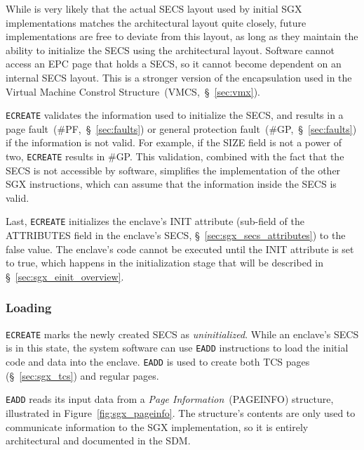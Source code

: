 While is very likely that the actual SECS layout used by initial SGX
implementations matches the architectural layout quite closely, future
implementations are free to deviate from this layout, as long as they maintain
the ability to initialize the SECS using the architectural layout.
Software cannot access an EPC page that holds a SECS, so it cannot become
dependent on an internal SECS layout. This is a stronger version of the
encapsulation used in the Virtual Machine Constrol
Structure~(VMCS,~\S~\ref{sec:vmx}).

\texttt{ECREATE} validates the information used to initialize the SECS, and
results in a page fault~(\#PF,~\S~\ref{sec:faults}) or general protection
fault~(\#GP,~\S~\ref{sec:faults}) if the information is not valid. For example,
if the SIZE field is not a power of two, \texttt{ECREATE} results in \#GP. This
validation, combined with the fact that the SECS is not accessible by software,
simplifies the implementation of the other SGX instructions, which can assume
that the information inside the SECS is valid.

Last, \texttt{ECREATE} initializes the enclave's INIT attribute (sub-field of
the ATTRIBUTES field in the enclave's SECS, \S~\ref{sec:sgx_secs_attributes})
to the false value. The enclave's code cannot be executed until the INIT
attribute is set to true, which happens in the initialization stage that will
be described in \S~\ref{sec:sgx_einit_overview}.


\subsubsection{Loading}
\label{sec:sgx_eadd}

\texttt{ECREATE} marks the newly created SECS as \textit{uninitialized}. While
an enclave's SECS is in this state, the system software can use \texttt{EADD}
instructions to load the initial code and data into the enclave. \texttt{EADD}
is used to create both TCS pages (\S~\ref{sec:sgx_tcs}) and regular pages.


\texttt{EADD} reads its input data from a \textit{Page Information}~(PAGEINFO)
structure, illustrated in Figure~\ref{fig:sgx_pageinfo}. The structure's
contents are only used to communicate information to the SGX implementation, so
it is entirely architectural and documented in the SDM.

